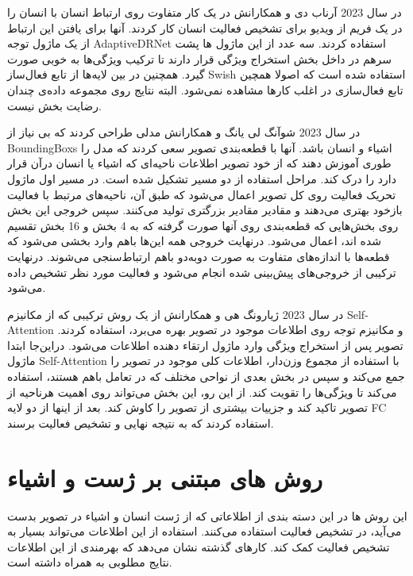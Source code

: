 	در سال 2023 آرناب دی و همکارانش %
	\cite{interactions_adaptive_drnet}
	در یک کار متفاوت روی ارتباط انسان با انسان را در یک فریم از ویدیو برای تشخیص فعالیت انسان کار کردند. آنها برای یافتن این ارتباط از یک ماژول توجه AdaptiveDRNet استفاده کردند. سه عدد از این ماژول ها پشت سرهم در داخل بخش استخراج ویژگی قرار دارند تا ترکیب ویژگی‌ها به خوبی صورت گیرد. همچنین در بین لایه‌‌ها از تابع فعال‌ساز Swish استفاده شده است که اصولا همچین تابع فعال‌سازی در اغلب کارها مشاهده نمی‌شود. البته نتایج روی مجموعه ‌داده‌ی %
	چندان رضایت بخش نیست.
	
	در سال 2023 شوآنگ لی یانگ و همکارانش %
	\cite{patch_boxless_action}
	مدلی طراحی کردند که بی نیاز از %
	\glspl{BoundingBox}
	اشیاء و انسان باشد. آنها با قطعه‌بندی تصویر سعی کردند که مدل را طوری آموزش دهند که از خود تصویر اطلاعات ناحیه‌ای که اشیاء یا انسان درآن قرار دارد را درک کند. مراحل استفاده از دو مسیر تشکیل شده است. در مسیر اول ماژول تحریک فعالیت روی کل تصویر اعمال می‌شود که طبق آن،‌ ناحیه‌های مرتبط با فعالیت بازخود بهتری می‌دهند و مقادیر مقادیر بزرگتری تولید می‌کنند. سپس خروجی این بخش روی بخش‌هایی که قطعه‌بندی روی آنها صورت گرفته که به 4 بخش و 16 بخش تقسیم شده اند، اعمال می‌شود. درنهایت خروجی همه این‌ها باهم وارد بخشی می‌شود که قطعه‌‌ها با اندازه‌های متفاوت به صورت دوبه‌دو باهم ارتباط‌سنجی می‌شوند. درنهایت ترکیبی از خروجی‌های پیش‌بینی شده انجام می‌شود و فعالیت مورد‌ نظر تشخیص داده می‌شود.
	
	در سال 2023 ژیارونگ هی و همکارانش %
	\cite{context_enhancment_methodology}
	از یک روش ترکیبی که از مکانیزم %
	\gls{Self-Attention}
	و مکانیزم توجه روی اطلاعات موجود در تصویر بهره می‌برد، استفاده کردند. تصویر پس‌ از استخراج ویژگی وارد ماژول ارتقاء دهنده اطلاعات می‌شود. دراین‌جا ابتدا ماژول %
	\gls{Self-Attention}
	با استفاده از مجموع وزن‌دار،‌ اطلاعات کلی موجود در تصویر را جمع می‌کند و سپس در بخش بعدی از نواحی مختلف که در تعامل باهم هستند، استفاده می‌کند تا ویژگی‌ها را تقویت کند. از این رو، این بخش می‌تواند روی اهمیت هرناحیه از تصویر تاکید کند و جزییات بیشتری از تصویر را کاوش کند. بعد از اینها از دو لایه FC%
	استفاده کردند که به نتیجه نهایی و تشخیص فعالیت برسند.

\section{روش های مبتنی بر ژست و اشیاء}
این روش ها در این دسته بندی از اطلاعاتی که از ژست انسان و اشیاء در تصویر بدست می‌آید، در تشخیص فعالیت استفاده می‌کنند. استفاده از این اطلاعات می‌تواند بسیار به تشخیص فعالیت کمک کند. کارهای گذشته نشان می‌دهد که بهرمندی از این اطلاعات نتایج مطلوبی به همراه داشته است.

